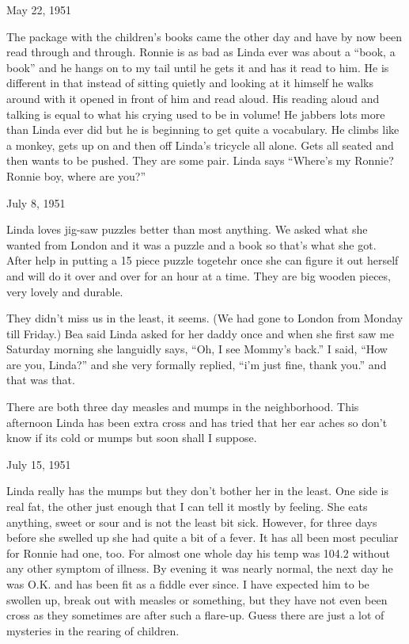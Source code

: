 \documentclass[]{book}
\begin{document}
May 22, 1951

The package with the children's books came the other day and have by now been read through and through. Ronnie is as bad as Linda ever was about a ``book, a book'' and he hangs on to my tail until he gets it and has it read to him. He is different in that instead of sitting quietly and looking at it himself he walks around with it opened in front of him and read aloud. His reading aloud and talking is equal to what his crying used to be in volume! He jabbers lots more than Linda ever did but he is beginning to get quite a vocabulary. He climbs like a monkey, gets up on and then off Linda's tricycle all alone. Gets all seated and then wants to be pushed. They are some pair. Linda says ``Where's my Ronnie? Ronnie boy, where are you?''

July 8, 1951

Linda loves jig-saw puzzles better than most anything. We asked what she wanted from London and it was a puzzle and a book so that's what she got. After help in putting a 15 piece puzzle togetehr once she can figure it out herself and will do it over and over for an hour at a time. They are big wooden pieces, very lovely and durable.

They didn't miss us in the least, it seems. (We had gone to London from Monday till Friday.) Bea said Linda asked for her daddy once and when she first saw me Saturday morning she languidly says, ``Oh, I see Mommy's back.'' I said, ``How are you, Linda?'' and she very formally replied, ``i'm just fine, thank you.'' and that was that.

There are both three day measles and mumps in the neighborhood. This afternoon Linda has been extra cross and has tried that her ear aches so don't know if its cold or mumps but soon shall I suppose.

July 15, 1951

Linda really has the mumps but they don't bother her in the least. One side is real fat, the other just enough that I can tell it mostly by feeling. She eats anything, sweet or sour and is not the least bit sick. However, for three days before she swelled up she had quite a bit of a fever. It has all been most peculiar for Ronnie had one, too. For almost one whole day his temp was 104.2 without any other symptom of illness. By evening it was nearly normal, the next day he was O.K. and has been fit as a fiddle ever since. I have expected him to be swollen up, break out with measles or something, but they have not even been cross as they sometimes are after such a flare-up. Guess there are just a lot of mysteries in the rearing of children.
\end{document}
